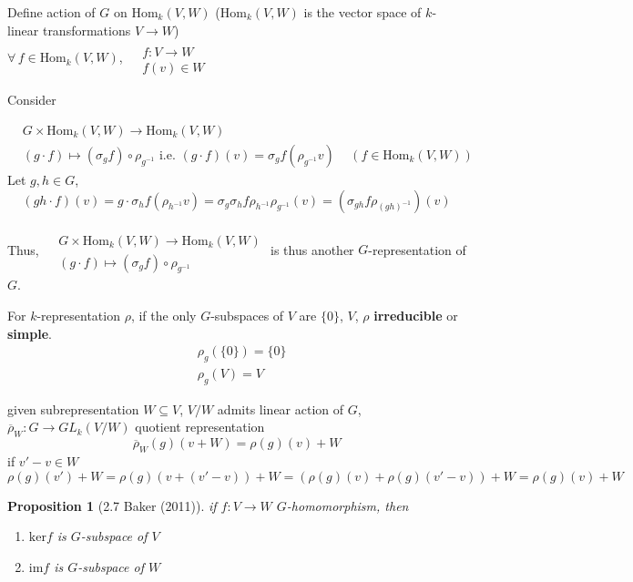 \documentclass[10pt]{amsart}
\newtheorem{proposition}{Proposition}
\begin{document}
\begin{multicols*}{2}
Define action of $G$ on $\text{Hom}_k(V,W)$ ($\text{Hom}_k(V,W)$ is the vector space of $k$-linear transformations $V\to W$) \\
$\forall \, f \in \text{Hom}_k(V,W)$, $\begin{aligned} & \quad \\
  & f : V \to W \\
  & f(v) \in W \end{aligned}$ \quad \, 

Consider

\[
\begin{aligned}
  & G \times \text{Hom}_k(V,W) \to \text{Hom}_k(V,W) \\ 
  & (g\cdot f) \mapsto (\sigma_g f) \circ \rho_{g^{-1}} \text{ i.e. } (g\cdot f)(v) = \sigma_gf(\rho_{g^{-1}}v) \quad \, (f\in \text{Hom}_k(V,W))
\end{aligned}
\]
Let $g,h \in G$, 
\[
(gh \cdot f)(v) = g\cdot \sigma_h f(\rho_{h^{-1}}v) = \sigma_g\sigma_h f\rho_{h^{-1}} \rho_{g^{-1}}(v) = (\sigma_{gh} f \rho_{(gh)^{-1}} )(v)
\]

Thus,  $\begin{aligned} & \quad \\
  & G \times \text{Hom}_k(V,W) \to \text{Hom}_k(V,W) \\ 
  & (g\cdot f) \mapsto (\sigma_g f)\circ \rho_{g^{-1}} \end{aligned}$ is thus another $G$-representation of $G$.  

For $k$-representation $\rho$, if the only $G$-subspaces of $V$ are $\lbrace 0 \rbrace$, $V$, $\rho$ \textbf{irreducible} or \textbf{simple}.  
\[
\begin{aligned}
  & \rho_g(\lbrace 0 \rbrace) = \lbrace 0 \rbrace \\ 
  &  \rho_g(V) = V
\end{aligned}
\]


given subrepresentation $W \subseteq V$, $V/W$ admits linear action of $G$, $\overline{\rho}_W : G \to GL_k(V/W)$ quotient representation 
\[
\overline{\rho}_W(g)(v+W) = \rho(g)(v) + W
\]
if $v'-v \in W$
\[
\rho(g)(v') + W = \rho(g)(v+(v'-v))+W = (\rho(g)(v) + \rho(g)(v'-v) ) + W = \rho(g)(v) + W
\]
\begin{proposition}[2.7 Baker (2011)\cite{ABaker2011}] \label{Prop:Baker2.7}
if $f:V \to W$ $G$-homomorphism, then
\begin{enumerate}
  \item[(a)] $\text{ker}{f}$ is $G$-subspace of $V$ 
\item[(b)] $\text{im}{f}$ is $G$-subspace of $W$
\end{enumerate}
\end{proposition}


\end{multicols*}
\end{document}
